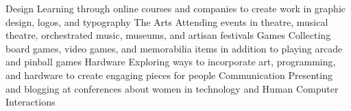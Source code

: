   \begin{cvskills} 
     	 \cvskill
      		{Design}
      		{Learning through online courses and companies to create work in graphic design, logos, and typography}
	 \cvskill
		{The Arts}
		{Attending events in theatre, musical theatre, orchestrated music, museums, and artisan festivals}
	\cvskill
		{Games}
		{Collecting board games, video games, and memorabilia items in addition to playing arcade and pinball games}
  	\cvskill
		{Hardware}
		{Exploring ways to incorporate art, programming, and hardware to create engaging pieces for people}
	\cvskill
		{Communication}
		{Presenting and blogging at conferences about women in technology and Human Computer Interactions}
  \end{cvskills}
